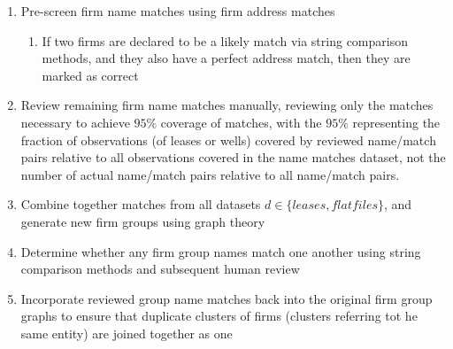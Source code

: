 \documentclass{article}
\begin{document}
\begin{enumerate}
    \item Pre-screen firm name matches using firm address matches
    \begin{enumerate}
    \item If two firms are declared to be a likely match via string comparison methods, and they also have a perfect address match, then they are marked as correct
    \end{enumerate}
    
    \item Review remaining firm name matches manually, reviewing only the matches necessary to achieve $95\%$ coverage of matches, with the $95\%$ representing the fraction of observations (of leases or wells) covered by reviewed name/match pairs relative to all observations covered in the name matches dataset, not the number of actual name/match pairs relative to all name/match pairs.
    
    \item Combine together matches from all datasets $d \in \{leases, flatfiles\}$, and generate new firm groups using graph theory
    
    \item Determine whether any firm group names match one another using string comparison methods and subsequent human review
    
    \item Incorporate reviewed group name matches back into the original firm group graphs to ensure that duplicate clusters of firms (clusters referring tot he same entity) are joined together as one 
\end{enumerate}
\end{document}

